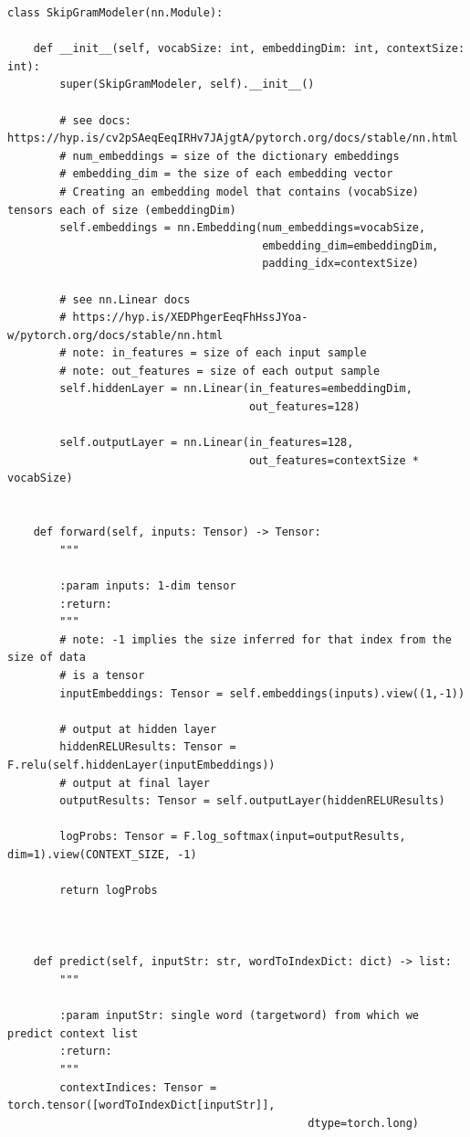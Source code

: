 \documentclass[
]{article}
\begin{document}
\begin{verbatim}
class SkipGramModeler(nn.Module):

    def __init__(self, vocabSize: int, embeddingDim: int, contextSize: int):
        super(SkipGramModeler, self).__init__()

        # see docs: https://hyp.is/cv2pSAeqEeqIRHv7JAjgtA/pytorch.org/docs/stable/nn.html
        # num_embeddings = size of the dictionary embeddings
        # embedding_dim = the size of each embedding vector
        # Creating an embedding model that contains (vocabSize) tensors each of size (embeddingDim)
        self.embeddings = nn.Embedding(num_embeddings=vocabSize,
                                       embedding_dim=embeddingDim,
                                       padding_idx=contextSize)

        # see nn.Linear docs
        # https://hyp.is/XEDPhgerEeqFhHssJYoa-w/pytorch.org/docs/stable/nn.html
        # note: in_features = size of each input sample
        # note: out_features = size of each output sample
        self.hiddenLayer = nn.Linear(in_features=embeddingDim,
                                     out_features=128)

        self.outputLayer = nn.Linear(in_features=128,
                                     out_features=contextSize * vocabSize)


    def forward(self, inputs: Tensor) -> Tensor:
        """

        :param inputs: 1-dim tensor
        :return:
        """
        # note: -1 implies the size inferred for that index from the size of data
        # is a tensor
        inputEmbeddings: Tensor = self.embeddings(inputs).view((1,-1))

        # output at hidden layer
        hiddenRELUResults: Tensor = F.relu(self.hiddenLayer(inputEmbeddings))
        # output at final layer
        outputResults: Tensor = self.outputLayer(hiddenRELUResults)

        logProbs: Tensor = F.log_softmax(input=outputResults, dim=1).view(CONTEXT_SIZE, -1)

        return logProbs



    def predict(self, inputStr: str, wordToIndexDict: dict) -> list:
        """

        :param inputStr: single word (targetword) from which we predict context list
        :return:
        """
        contextIndices: Tensor = torch.tensor([wordToIndexDict[inputStr]],
                                              dtype=torch.long)


\end{verbatim}
\end{document}
